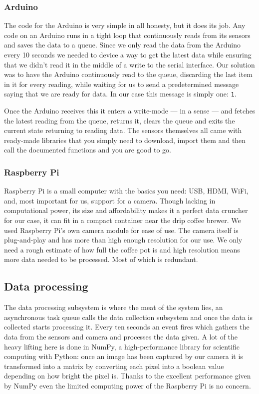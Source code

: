\documentclass[12pt,a4paper,oneside,article]{memoir}
\numberwithin{equation}{chapter}
\begin{document}
\subsubsection{Arduino}\label{sec:arduino}
The code for the Arduino is very simple in all honesty, but it does its job. Any
code on an Arduino runs in a tight loop that continuously reads from its sensors
and saves the data to a queue. Since we only read the data from the Arduino
every 10 seconds we needed to device a way to get the latest data while ensuring
that we didn't read it in the middle of a write to the serial interface. Our
solution was to have the Arduino continuously read to the queue, discarding the
last item in it for every reading, while waiting for us to send a predetermined
message saying that we are ready for data. In our case this message is simply
one: \lstinline{1}.

Once the Arduino receives this it enters a write-mode --- in a sense --- and
fetches the latest reading from the queue, returns it, clears the queue and
exits the current state returning to reading data. The sensors themselves all
came with ready-made libraries that you simply need to download, import them and
then call the documented functions and you are good to go.

\subsubsection{Raspberry Pi}\label{sec:raspberry-pi}
Raspberry Pi is a small computer with the basics you need: USB, HDMI, WiFi, and,
most important for us, support for a camera. Though lacking in computational
power, its size and affordability makes it a perfect data cruncher for our case,
it can fit in a compact container near the drip coffee brewer. We used Raspberry
Pi's own camera module for ease of use. The camera itself is plug-and-play and
has more than high enough resolution for our use. We only need a rough estimate
of how full the coffee pot is and high resolution means more data needed to be
processed. Most of which is redundant.

\subsection{Data processing}\label{sec:data-processing}
The data processing subsystem is where the meat of the system lies, an
asynchronous task queue calls the data collection subsystem and once the data is
collected starts processing it. Every ten seconds an event fires which gathers
the data from the sensors and camera and processes the data given. A lot of the
heavy lifting here is done in NumPy, a high-performance library for scientific
computing with Python: once an image has been captured by our camera it is
transformed into a matrix by converting each pixel into a boolean value
depending on how bright the pixel is. Thanks to the excellent performance given
by NumPy even the limited computing power of the Raspberry Pi is no concern.
\end{document}
